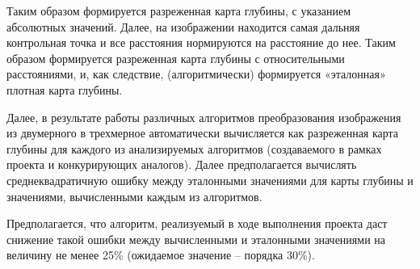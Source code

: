 Таким образом формируется разреженная карта глубины, с указанием абсолютных значений. Далее, на изображении находится самая дальняя контрольная точка и все расстояния нормируются на расстояние до нее. Таким образом формируется разреженная карта глубины с относительными расстояниями, и, как следствие, (алгоритмически) формируется «эталонная» плотная карта глубины.

Далее, в результате работы различных алгоритмов преобразования изображения из двумерного в трехмерное автоматически вычисляется как разреженная карта глубины для каждого из анализируемых алгоритмов (создаваемого в рамках проекта и конкурирующих аналогов). Далее предполагается вычислять среднеквадратичную ошибку между эталонными значениями для карты глубины и значениями, вычисленными каждым из алгоритмов.

Предполагается, что алгоритм, реализуемый в ходе выполнения проекта даст снижение такой ошибки между вычисленными и эталонными значениями на величину не менее 25\% (ожидаемое значение – порядка 30\%).